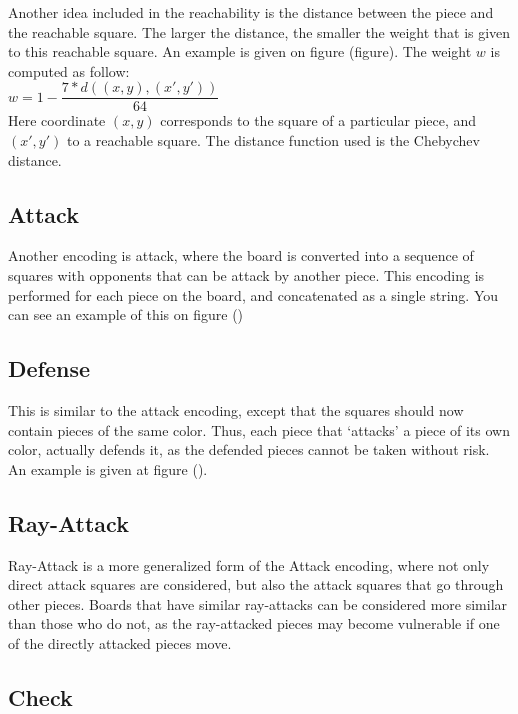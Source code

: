 \documentclass[11pt]{article}
\begin{document}
    Another idea included in the reachability is the distance between the piece and the reachable square. The larger the distance, the smaller the weight that is given to this reachable square. An example is given on figure (figure).
    The weight $w$ is computed as follow:\\

    $w = 1 - \dfrac{7 * d((x,y),(x',y'))}{64}$ \\

    Here coordinate $(x,y)$ corresponds to the square of a particular piece, and $(x',y')$ to a reachable square. The distance function used is the Chebychev distance.\\

    \subsection{Attack}

    Another encoding is attack, where the board is converted into a sequence of squares with opponents that can be attack by another piece. This encoding is performed for each piece on the board, and concatenated as a single string. You can see an example of this on figure ()

    \subsection{Defense}

    This is similar to the attack encoding, except that the squares should now contain pieces of the same color. Thus, each piece that `attacks' a piece of its own color, actually defends it, as the defended pieces cannot be taken without risk. An example is given at figure ().

    \subsection{Ray-Attack}

    Ray-Attack is a more generalized form of the Attack encoding, where not only direct attack squares are considered, but also the attack squares that go through other pieces. Boards that have similar ray-attacks can be considered more similar than those who do not, as the ray-attacked pieces may become vulnerable if one of the directly attacked pieces move.

    \subsection{Check}
\end{document}
